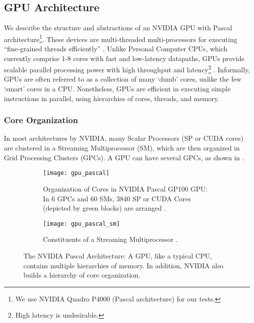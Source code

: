 \subsection{GPU Architecture} \label{sec:GPU Architecture}
We describe the structure and abstractions of an NVIDIA GPU with Pascal architecture\footnote{We use NVIDIA Quadro P4000 (Pascal architecture) for our tests.}. These devices are multi-threaded multi-processors for executing ``fine-grained threads efficiently'' \cite[Appendix~B.4]{PattersonARM}. Unlike Personal Computer CPUs, which currently comprise 1-8 cores with fast and low-latency datapaths, GPUs provide scalable parallel processing power with high throughput and latency\footnote{High latency is undesirable.} \cite{PattersonARM, DemystifyingGPU}. Informally, GPUs are often referred to as a collection of many `dumb' cores, unlike the few `smart' cores in a CPU. Nonetheless, GPUs are efficient in executing simple instructions in parallel, using hierarchies of cores, threads, and memory.

\subsubsection{Core Organization}
In most architectures by NVIDIA, many Scalar Processors (SP or CUDA cores) are clustered in a Streaming Multiprocessor (SM), which are then organized in Grid Processing Clusters (GPCs). A GPU can have several GPCs, as shown in  \cite{CUDADocs, ParallelNVIDIA, DemystifyingGPU}.
\begin{figure}
    \centering
    \begin{subfigure}{\textwidth}
        \centering
        \texttt{[image: gpu\_pascal]}
        \caption[Organization of Cores in NVIDIA Pascal GP100 GPU]{Organization of Cores in NVIDIA Pascal GP100 GPU: In 6 GPCs and 60 SMs, 3840 SP or CUDA Cores (depicted by green blocks) are arranged \cite{PascalWhitepaper, ParallelNVIDIA}.}
        \label{fig:Organization of Cores in NVIDIA Pascal GP100 GPU}
    \end{subfigure}\vspace*{1em}
    \begin{subfigure}{\textwidth}
        \centering
        \texttt{[image: gpu\_pascal\_sm]}
        \caption[Constituents of a Streaming Multiprocessor]{Constituents of a Streaming Multiprocessor \cite{PascalWhitepaper, ParallelNVIDIA}.}
        \label{fig:Constituents of a Streaming Multiprocessor}
    \end{subfigure}
    \caption[The NVIDIA Pascal Architecture]{The NVIDIA Pascal Architecture: A GPU, like a typical CPU, contains multiple hierarchies of memory. In addition, NVIDIA also builds a hierarchy of core organization.}
    \label{fig:The NVIDIA Pascal Architecture}
\end{figure}

